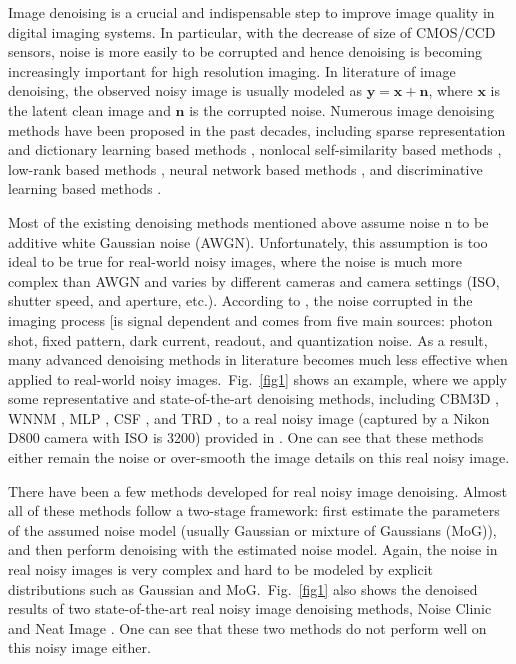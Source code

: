 \documentclass[10pt,twocolumn,letterpaper]{article}
\begin{document}
Image denoising is a crucial and indispensable step to improve image quality in digital imaging systems. In particular, with the decrease of size of CMOS/CCD sensors, noise is more easily to be corrupted and hence denoising is becoming increasingly important for high resolution imaging. In literature of image denoising, the observed noisy image is usually modeled as $\mathbf{y}=\mathbf{x}+\mathbf{n}$, where $\mathbf{x}$ is the latent clean image and $\mathbf{n}$ is the corrupted noise. Numerous image denoising methods \cite{ksvd,lssc,ncsr,nlm,bm3d,cbm3d,pgpd,wnnm,mlp,csf,chen2015learning,foe,epll} have been proposed in the past decades, including sparse representation and dictionary learning based methods \cite{ksvd,lssc,ncsr}, nonlocal self-similarity based methods \cite{nlm,bm3d,cbm3d,ncsr,pgpd}, low-rank based methods \cite{wnnm}, neural network based methods \cite{mlp}, and discriminative learning based methods \cite{csf,chen2015learning}. 

Most of the existing denoising methods \cite{ksvd,lssc,nlm,bm3d,cbm3d,ncsr,pgpd,wnnm,mlp,csf,chen2015learning,foe,epll} mentioned above assume noise n to be additive white Gaussian noise (AWGN). Unfortunately, this assumption is too ideal to be true for real-world noisy images, where the noise is much more complex than AWGN \cite{crosschannel2016,healey1994radiometric} and varies by different cameras and camera settings (ISO, shutter speed, and aperture, etc.). According to \cite{healey1994radiometric}, the noise corrupted in the imaging process [is signal dependent and comes from five main sources: photon shot, fixed pattern, dark current, readout, and quantization noise. As a result, many advanced denoising methods in literature becomes much less effective when applied to real-world noisy images.\ Fig.\ \ref{fig1} shows an example, where we apply some representative and state-of-the-art denoising methods, including CBM3D \cite{cbm3d}, WNNM \cite{wnnm}, MLP \cite{mlp}, CSF \cite{csf}, and TRD \cite{chen2015learning}, to a real noisy image (captured by a Nikon D800 camera with ISO is 3200) provided in \cite{crosschannel2016}. One can see that these methods either remain the noise or over-smooth the image details on this real noisy image. 

There have been a few methods \cite{Liu2008,almapg,Zhu_2016_CVPR,crosschannel2016,noiseclinic,ncwebsite,neatimage} developed for real noisy image denoising. Almost all of these methods follow a two-stage framework: first estimate the parameters of the assumed noise model (usually Gaussian  or mixture of Gaussians (MoG)), and then perform denoising with the estimated noise model. Again, the noise in real noisy images is very complex and hard to be modeled by explicit distributions such as Gaussian and MoG.\ Fig.\ \ref{fig1} also shows the denoised results of two state-of-the-art real noisy image denoising methods, Noise Clinic \cite{noiseclinic,ncwebsite} and Neat Image \cite{neatimage}. One can see that these two methods do not perform well on this noisy image either. 
\end{document}
